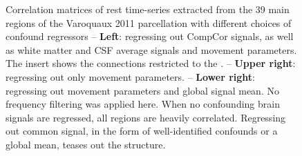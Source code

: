 \documentclass[5p]{elsarticle}
\begin{document}
\begin{figure}

\caption{
Correlation matrices of rest time-series extracted from the 39 main
regions of the Varoquaux 2011 \cite{varoquaux2011} parcellation with
different choices of confound regressors -- 
\textbf{Left}: regressing out CompCor signals, as well as white matter and
CSF average signals and movement parameters. The insert shows the
connections restricted to the .
-- \textbf{Upper right}: regressing out only movement parameters. -- 
\textbf{Lower right}:
regressing out movement parameters and global signal mean.
No frequency filtering was applied here.
\label{fig:correlation_matrices}
When no confounding brain signals are regressed, all regions are heavily
correlated. Regressing out common signal, in the form of well-identified
confounds or a global mean, teases out the structure.
}
\end{figure}


\end{document}
